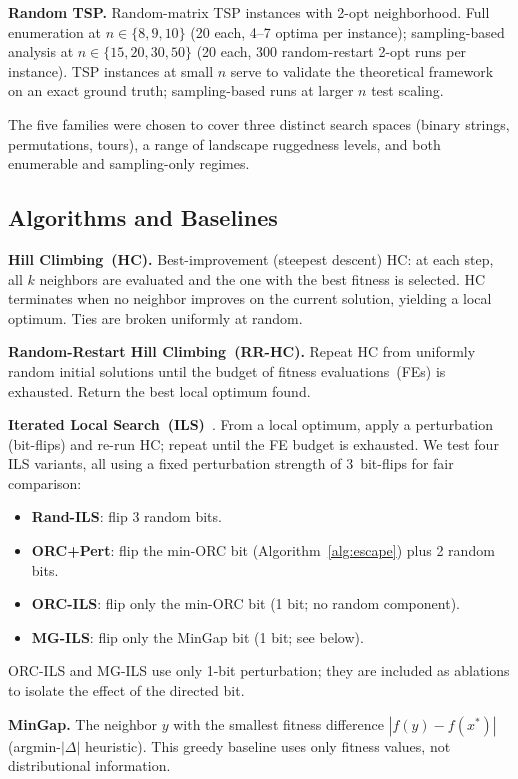 \documentclass[runningheads]{llncs}
\begin{document}
\textbf{Random TSP.}
Random-matrix TSP instances with 2-opt neighborhood.
Full enumeration at $n \in \{8, 9, 10\}$ (20 each, 4--7 optima per instance); sampling-based analysis at $n \in \{15, 20, 30, 50\}$ (20 each, 300 random-restart 2-opt runs per instance).
TSP instances at small $n$ serve to validate the theoretical framework on an exact ground truth; sampling-based runs at larger $n$ test scaling.

The five families were chosen to cover three distinct search spaces (binary strings, permutations, tours), a range of landscape ruggedness levels, and both enumerable and sampling-only regimes.

\subsection{Algorithms and Baselines}
\label{sec:baselines}

\textbf{Hill Climbing~(HC).}
Best-improvement (steepest descent) HC: at each step, all $k$ neighbors are evaluated and the one with the best fitness is selected.
HC terminates when no neighbor improves on the current solution, yielding a local optimum.
Ties are broken uniformly at random.

\textbf{Random-Restart Hill Climbing~(RR-HC).}
Repeat HC from uniformly random initial solutions until the budget of fitness evaluations~(FEs) is exhausted.
Return the best local optimum found.

\textbf{Iterated Local Search~(ILS)}~\cite{lourenco2003ils}.
From a local optimum, apply a perturbation (bit-flips) and re-run HC; repeat until the FE budget is exhausted.
We test four ILS variants, all using a fixed perturbation strength of 3~bit-flips for fair comparison:
\begin{itemize}
\item \textbf{Rand-ILS}: flip 3 random bits.
\item \textbf{ORC+Pert}: flip the min-ORC bit (Algorithm~\ref{alg:escape}) plus 2 random bits.
\item \textbf{ORC-ILS}: flip only the min-ORC bit (1 bit; no random component).
\item \textbf{MG-ILS}: flip only the MinGap bit (1 bit; see below).
\end{itemize}
ORC-ILS and MG-ILS use only 1-bit perturbation; they are included as ablations to isolate the effect of the directed bit.

\textbf{MinGap.}
The neighbor $y$ with the smallest fitness difference $|f(y) - f(x^*)|$ (argmin-$|\Delta|$ heuristic).
This greedy baseline uses only fitness values, not distributional information.
\end{document}
